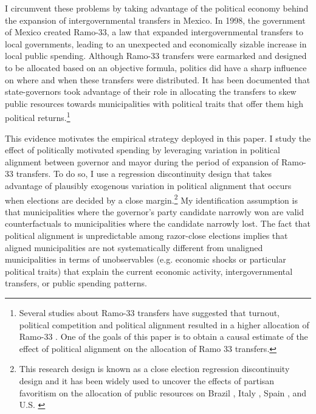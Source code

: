 \documentclass[dv_diss_main.tex]{subfiles}
\begin{document}
I circumvent these problems by taking advantage of the political economy behind the expansion of intergovernmental transfers in Mexico. In 1998, the government of Mexico created Ramo-33, a law that expanded intergovernmental transfers to local governments, leading to an unexpected and economically sizable increase in local public spending. Although Ramo-33 transfers were earmarked and designed to be allocated based on an objective formula, politics did have a sharp influence on where and when these transfers were distributed. It has been documented that state-governors took advantage of their role in allocating the transfers to skew public resources towards municipalities with political traits that offer them high political returns.\footnote{
Several studies about Ramo-33 transfers have suggested that turnout, political competition and political alignment resulted in a higher allocation of Ramo-33 \citep{diaz2004descentralizacion,langston2010governors,trillo2007transferences}. One of the goals of this paper is to obtain a causal estimate of the effect of political alignment on the allocation of Ramo 33 transfers.}

This evidence motivates the empirical strategy deployed in this paper. I study the effect of politically motivated spending by leveraging variation in political alignment between governor and mayor during the period of expansion of Ramo-33 transfers. To do so, I use a regression discontinuity design that takes advantage of plausibly exogenous variation in political alignment that occurs when elections are decided by a close margin.\footnote{
This research design is known as a close election regression discontinuity design and it has been widely used to uncover the effects of partisan favoritism on the allocation of public resources on Brazil \citep{brollo2012tying}, Italy \citep{bracco2015intergovernmental}, Spain \citep{curto2018does}, and U.S. \citep{albouy2013partisan}
} My identification assumption is that municipalities where the governor's party candidate narrowly won are valid counterfactuals to municipalities where the candidate narrowly lost.
The fact that political alignment is unpredictable among razor-close elections implies that aligned municipalities are not systematically different from unaligned municipalities in terms of unobservables (e.g. economic shocks or particular political traits) that explain the current economic activity, intergovernmental transfers, or public spending patterns.
\end{document}
